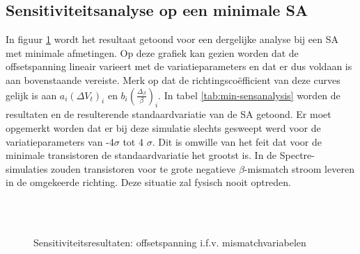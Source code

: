 \subsection{Sensitiviteitsanalyse op een minimale SA}
In figuur \ref{fig:min-sensanalysis} wordt het resultaat getoond voor een dergelijke analyse bij een SA met minimale afmetingen. Op deze grafiek kan gezien worden dat de offsetspanning lineair varieert met de variatieparameters en dat er dus voldaan is aan bovenstaande vereiste. Merk op dat de richtingscoëfficient van deze curves gelijk is aan $a_{i} (\Delta V_{t})_{i}$ en $b_{i} (\frac{\Delta_{\beta}}{\beta})_{i}$. In tabel \ref{tab:min-sensanalysis} worden de resultaten en de resulterende standaardvariatie van de SA getoond.
Er moet opgemerkt worden dat er bij deze simulatie slechts gesweept werd voor de variatieparameters van -4$\sigma$ tot 4 $\sigma$. Dit is omwille van het feit dat voor de minimale transistoren de standaardvariatie het grootst is. In de Spectre-simulaties zouden transistoren voor te grote negatieve $\beta$-mismatch stroom leveren in de omgekeerde richting. Deze situatie zal fysisch nooit optreden.\\\\

\begin{figure}[!ht]
\centering
{} \\

\caption[Sensitiviteitsresultaten: offsetspanning i.f.v. mismatchvariabelen]{Sensitiviteitsresultaten: offsetspanning i.f.v. mismatchvariabelen}
\label{fig:min-sensanalysis}
\end{figure}


